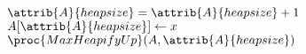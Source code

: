 \begin{codebox}
\li $\attrib{A}{heapsize} = \attrib{A}{heapsize} + 1$
\li $A[\attrib{A}{heapsize}] \gets x$
\li $\proc{MaxHeapifyUp}(A,\attrib{A}{heapsize})$
\end{codebox}